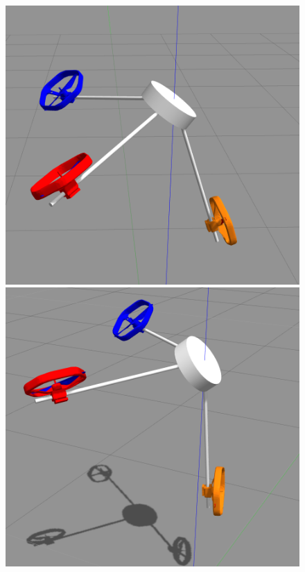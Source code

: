 \begin{figure}[!ht]
  \begin{center}
  \begin{minipage}[t]{0.24\textwidth}
    \centering
    \includegraphics[width=\linewidth]{images/tri_sim1.png}
  \end{minipage}
  \hfill
  \begin{minipage}[t]{0.24\textwidth}
    \centering
    \includegraphics[width=\linewidth]{images/tri_sim2.png}

\end{minipage}
\end{center}
\end{figure}
